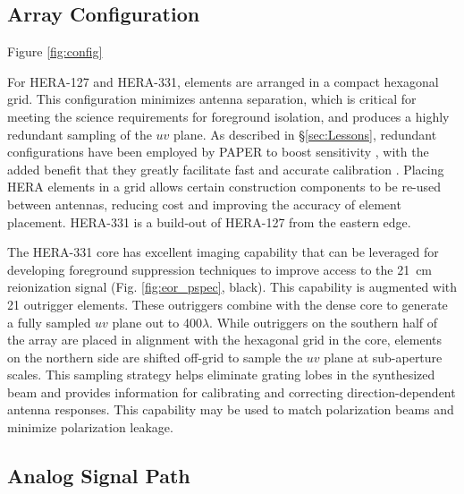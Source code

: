 \documentclass[ars]{copernicus}
\begin{document}
\subsection{Array Configuration}

 Figure \ref{fig:config}

For HERA-127 and HERA-331, elements are arranged in a compact hexagonal grid.
This configuration minimizes antenna separation, which is critical for meeting
the science requirements for foreground isolation, and 
produces a highly redundant sampling of the $uv$ plane.  As described in
\S\ref{sec:Lessons}, redundant configurations have been employed by PAPER to
boost sensitivity \citep{parsons_et_al2012a}, with the added benefit that they
greatly facilitate fast and accurate calibration
\citep{liu_et_al2010,parsons_et_al2013}.  Placing HERA elements in a
grid allows certain construction components to be re-used between antennas,
reducing cost and improving the accuracy of element placement.  HERA-331 
is a build-out of HERA-127 from the eastern edge.

The HERA-331 core has excellent
imaging capability that can be leveraged for developing foreground suppression techniques
to improve access to the 21~cm reionization signal 
(Fig. \ref{fig:eor_pspec}, black).
This capability is augmented with 21 outrigger elements.  These outriggers
combine with the dense core to generate a fully
sampled $uv$ plane out to 400$\lambda$.  While outriggers on the southern half of the array are
placed in alignment with the hexagonal grid in the core, elements on the northern side are
shifted off-grid to sample the $uv$ plane at sub-aperture scales.
This sampling strategy helps eliminate grating lobes in the
synthesized beam and provides information for
calibrating and correcting direction-dependent antenna responses.  This capability may
be used to match polarization beams and minimize
polarization leakage.

\subsection{Analog Signal Path}
\end{document}
